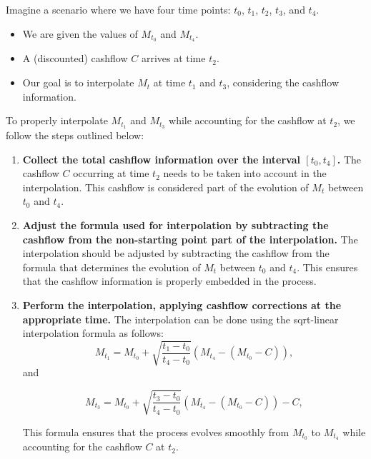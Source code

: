 \documentclass{article}
\begin{document}
Imagine a scenario where we have four time points: \( t_0 \), \( t_1 \), \( t_2 \), \( t_3 \), and \( t_4 \). 

\begin{itemize}
    \item We are given the values of \( M_{t_0} \) and \( M_{t_4} \).
    \item A (discounted) cashflow \( C \) arrives at time \( t_2 \).
    \item Our goal is to interpolate \( M_t \) at time \( t_1 \) and \( t_3 \), considering the cashflow information.
\end{itemize}


To properly interpolate \( M_{t_1} \) and \( M_{t_3} \) while accounting for the cashflow at \( t_2 \), we follow the steps outlined below:

\begin{enumerate}
    \item \textbf{Collect the total cashflow information over the interval \([t_0, t_4]\).} 
    The cashflow \( C \) occurring at time \( t_2 \) needs to be taken into account in the interpolation. This cashflow is considered part of the evolution of \( M_t \) between \( t_0 \) and \( t_4 \).

    \item \textbf{Adjust the formula used for interpolation by subtracting the cashflow from the non-starting point part of the interpolation.}
    The interpolation should be adjusted by subtracting the cashflow from the formula that determines the evolution of \( M_t \) between \( t_0 \) and \( t_4 \). This ensures that the cashflow information is properly embedded in the process.

    \item \textbf{Perform the interpolation, applying cashflow corrections at the appropriate time.}
    The interpolation can be done using the sqrt-linear interpolation formula as follows:
    \[
    M_{t_1} = M_{t_0} + \sqrt{\frac{t_1 - t_0}{t_4 - t_0}} \left( M_{t_4} - (M_{t_0} - C) \right),
    \]
    and

    \[
    M_{t_3} = M_{t_0} + \sqrt{\frac{t_3 - t_0}{t_4 - t_0}} \left( M_{t_4} - (M_{t_0} - C) \right) - C,
    \]
    
    This formula ensures that the process evolves smoothly from \( M_{t_0} \) to \( M_{t_4} \) while accounting for the cashflow \( C \) at \( t_2 \). 

\end{enumerate}
\end{document}
